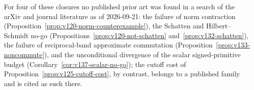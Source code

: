 
For four of these closures no published prior art was found in a search
of the arXiv and journal literature as of 2026-09-21: the failure of
norm contraction (Proposition~\ref{prop:v120-norm-counterexample}), the
Schatten and Hilbert--Schmidt no-go
(Propositions~\ref{prop:v120-not-schatten} and~\ref{prop:v132-schatten}),
the failure of reciprocal-band approximate commutation
(Proposition~\ref{prop:v133-noncommute}), and the unconditional
divergence of the scalar signed-primitive budget
(Corollary~\ref{cor:v137-scalar-no-go}); the cutoff cost of
Proposition~\ref{prop:v125-cutoff-cost}, by contrast, belongs to a
published family and is cited as such there.
